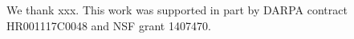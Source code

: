 \label{s:acknowledgements}
 We thank xxx.
This work was supported in part by DARPA contract HR001117C0048 and NSF grant 1407470.
